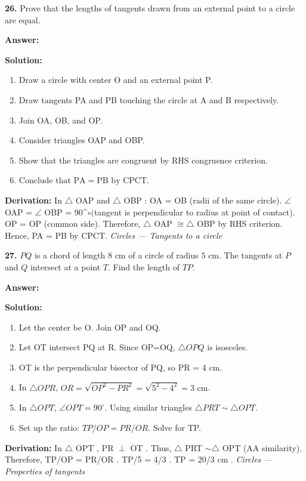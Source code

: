 \documentclass[12pt,a4paper]{exam}
\newcommand{\fitmath}[1]{%
  \sbox{\schmathbox}{$\displaystyle #1$}%
  \ifdim\wd\schmathbox>\linewidth
    \resizebox{\linewidth}{!}{\usebox{\schmathbox}}%
  \else
    \usebox{\schmathbox}%
  \fi}
\begin{document}
\begin{questions}
\question \textbf{26.} Prove that the lengths of tangents drawn from an external point to a circle are equal.

\textbf{Answer:}
\begin{center}
\fitmath{PA = PB}
\end{center}

\textbf{Solution:}
\begin{enumerate}
  \item Draw a circle with center O and an external point P.
  \item Draw tangents PA and PB touching the circle at A and B respectively.
  \item Join OA, OB, and OP.
  \item Consider triangles OAP and OBP.
  \item Show that the triangles are congruent by RHS congruence criterion.
  \item \(
\text{Conclude that PA} = \text{PB by CPCT}.
\)
\end{enumerate}
\textbf{Derivation:}
In  $\triangle$ OAP  and  $\triangle$ OBP :  OA = OB  (radii of the same circle).  $\angle$ OAP = $\angle$ OBP = 90\textasciicircum{}$\circ  ($tangent is perpendicular to radius at point of contact).  OP = OP  (common side). Therefore,  $\triangle$ OAP $\cong \triangle$ OBP  by RHS criterion. Hence,  PA = PB  by CPCT.
\hfill \textit{Circles — Tangents to a circle}
\vspace{0.3cm}

\question \textbf{27.} $PQ$ is a chord of length $8\text{ cm}$ of a circle of radius $5\text{ cm}$. The tangents at $P$ and $Q$ intersect at a point $T$. Find the length of $TP$.

\textbf{Answer:}
\begin{center}
\fitmath{TP = 20/3 cm}
\end{center}

\textbf{Solution:}
\begin{enumerate}
  \item Let the center be O. Join OP and OQ.
  \item Let OT intersect PQ at R. Since OP=OQ, $\triangle OPQ$ is isosceles.
  \item OT is the perpendicular bisector of PQ, so PR = 4 cm.
  \item In $\triangle OPR$, $OR = \sqrt{OP^2 - PR^2} = \sqrt{5^2 - 4^2} = 3\text{ cm}$.
  \item In $\triangle OPT$, $\angle OPT = 90^\circ$. Using similar triangles $\triangle PRT \sim \triangle OPT$.
  \item Set up the ratio: $TP/OP = PR/OR$. Solve for TP.
\end{enumerate}
\textbf{Derivation:}
In  $\triangle$ OPT ,  PR $\perp$ OT . Thus,  $\triangle$ PRT $\sim \triangle$ OPT  (AA similarity). Therefore,  TP/OP = PR/OR .  TP/5 = 4/3 .  TP = 20/3$\text{ cm}$ .
\hfill \textit{Circles — Properties of tangents}
\vspace{0.3cm}


\end{questions}
\end{document}
